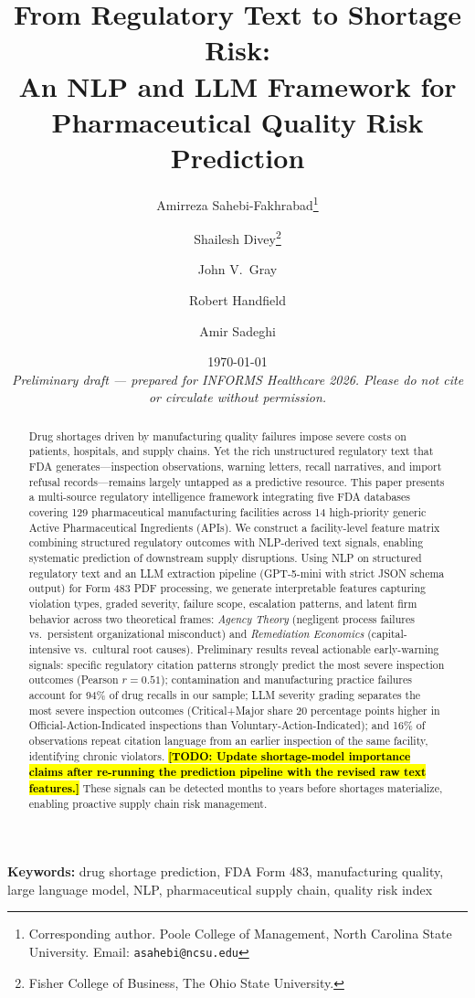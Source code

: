 \documentclass[12pt]{article}
\title{\textbf{From Regulatory Text to Shortage Risk:\\
  An NLP and LLM Framework for Pharmaceutical Quality Risk Prediction}}
\author{
  Amirreza Sahebi-Fakhrabad\thanks{Corresponding author.
    Poole College of Management, North Carolina State University.
    Email: \texttt{asahebi@ncsu.edu}} \and
  Shailesh Divey\thanks{Fisher College of Business, The Ohio State University.} \and
  John V.\ Gray\footnotemark[2] \and
  Robert Handfield\footnotemark[1] \and
  Amir Sadeghi\footnotemark[1]
}
\date{\today \\ \vspace{4pt}
  \textit{Preliminary draft — prepared for INFORMS Healthcare 2026.
  Please do not cite or circulate without permission.}}
\newcommand{\todo}[1]{\hl{\textbf{[TODO: #1]}}}
\begin{document}
\maketitle

\begin{abstract}
Drug shortages driven by manufacturing quality failures impose severe costs on patients,
hospitals, and supply chains.
Yet the rich unstructured regulatory text that FDA generates---inspection observations,
warning letters, recall narratives, and import refusal records---remains largely
untapped as a predictive resource.
This paper presents a multi-source regulatory intelligence framework integrating five
FDA databases covering 129 pharmaceutical manufacturing facilities across 14
high-priority generic Active Pharmaceutical Ingredients (APIs).
We construct a facility-level feature matrix combining structured regulatory outcomes
with NLP-derived text signals, enabling systematic prediction of downstream supply
disruptions.
Using NLP on structured regulatory text and an LLM extraction pipeline
(GPT-5-mini with strict JSON schema output) for Form 483 PDF processing, we
generate interpretable features capturing violation types, graded severity,
failure scope, escalation patterns, and latent firm behavior across two
theoretical frames: \emph{Agency Theory} (negligent process failures vs.\
persistent organizational misconduct) and \emph{Remediation Economics}
(capital-intensive vs.\ cultural root causes).
Preliminary results reveal actionable early-warning signals: specific regulatory
citation patterns strongly predict the most severe inspection outcomes
(Pearson $r = 0.51$); contamination and manufacturing practice failures account for
94\% of drug recalls in our sample; LLM severity grading separates the most severe
inspection outcomes (Critical+Major share 20 percentage points higher in
Official-Action-Indicated inspections than Voluntary-Action-Indicated); and
16\% of observations repeat citation language from an earlier inspection of the
same facility, identifying chronic violators.
\todo{Update shortage-model importance claims after re-running the prediction
pipeline with the revised raw text features.}
These signals can be detected months to years before shortages materialize, enabling
proactive supply chain risk management.
\end{abstract}

\textbf{Keywords:} drug shortage prediction, FDA Form 483, manufacturing quality,
large language model, NLP, pharmaceutical supply chain, quality risk index
\end{document}
